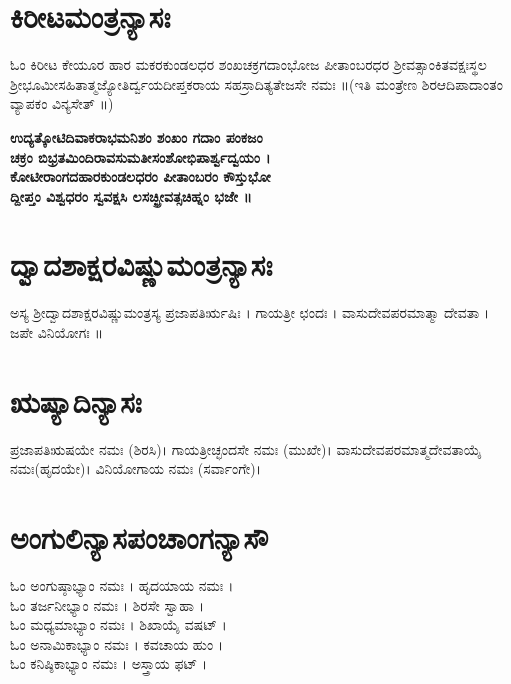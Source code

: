  \section{ಕಿರೀಟಮಂತ್ರನ್ಯಾಸಃ}
ಓಂ ಕಿರೀಟ ಕೇಯೂರ ಹಾರ ಮಕರಕುಂಡಲಧರ ಶಂಖಚಕ್ರಗದಾಂಭೋಜ ಪೀತಾಂಬರಧರ ಶ್ರೀವತ್ಸಾಂಕಿತವಕ್ಷಃಸ್ಥಲ ಶ್ರೀಭೂಮೀಸಹಿತಾತ್ಮಜ್ಯೋತಿರ್ದ್ವಯದೀಪ್ತಕರಾಯ ಸಹಸ್ರಾದಿತ್ಯತೇಜಸೇ ನಮಃ ॥(ಇತಿ ಮಂತ್ರೇಣ ಶಿರಆದಿಪಾದಾಂತಂ ವ್ಯಾಪಕಂ ವಿನ್ಯಸೇತ್ ॥)
\begin{center}{\bfseries ಉದ್ಯತ್ಕೋಟಿದಿವಾಕರಾಭಮನಿಶಂ ಶಂಖಂ ಗದಾಂ ಪಂಕಜಂ\\
ಚಕ್ರಂ ಬಿಭ್ರತಮಿಂದಿರಾವಸುಮತೀಸಂಶೋಭಿಪಾರ್ಶ್ವದ್ವಯಂ ।\\
ಕೋಟೀರಾಂಗದಹಾರಕುಂಡಲಧರಂ ಪೀತಾಂಬರಂ ಕೌಸ್ತುಭೋ\\
ದ್ದೀಪ್ತಂ ವಿಶ್ವಧರಂ ಸ್ವವಕ್ಷಸಿ ಲಸಚ್ಛ್ರೀವತ್ಸಚಿಹ್ನಂ ಭಜೇ ॥}\end{center}
\newpage
 \section{ದ್ವಾದಶಾಕ್ಷರವಿಷ್ಣುಮಂತ್ರನ್ಯಾಸಃ}
ಅಸ್ಯ ಶ್ರೀದ್ವಾದಶಾಕ್ಷರವಿಷ್ಣುಮಂತ್ರಸ್ಯ ಪ್ರಜಾಪತಿರ್ಋಷಿಃ । ಗಾಯತ್ರೀ ಛಂದಃ । ವಾಸುದೇವಪರಮಾತ್ಮಾ ದೇವತಾ । ಜಪೇ ವಿನಿಯೋಗಃ ॥
 \section{ಋಷ್ಯಾದಿನ್ಯಾಸಃ}
ಪ್ರಜಾಪತಿಋಷಯೇ ನಮಃ (ಶಿರಸಿ)। ಗಾಯತ್ರೀಚ್ಛಂದಸೇ ನಮಃ (ಮುಖೇ)। ವಾಸುದೇವಪರಮಾತ್ಮದೇವತಾಯೈ ನಮಃ(ಹೃದಯೇ)। ವಿನಿಯೋಗಾಯ ನಮಃ (ಸರ್ವಾಂಗೇ)।
  \section{ಅಂಗುಲಿನ್ಯಾಸಪಂಚಾಂಗನ್ಯಾಸೌ}
ಓಂ  ಅಂಗುಷ್ಠಾಭ್ಯಾಂ ನಮಃ । ಹೃದಯಾಯ ನಮಃ ।\\
ಓಂ  ತರ್ಜನೀಭ್ಯಾಂ ನಮಃ । ಶಿರಸೇ ಸ್ವಾಹಾ ।\\
ಓಂ  ಮಧ್ಯಮಾಭ್ಯಾಂ ನಮಃ । ಶಿಖಾಯೈ ವಷಟ್ ।\\
ಓಂ  ಅನಾಮಿಕಾಭ್ಯಾಂ ನಮಃ । ಕವಚಾಯ ಹುಂ ।\\
ಓಂ  ಕನಿಷ್ಠಿಕಾಭ್ಯಾಂ ನಮಃ । ಅಸ್ತ್ರಾಯ ಫಟ್ ।
\newpage
